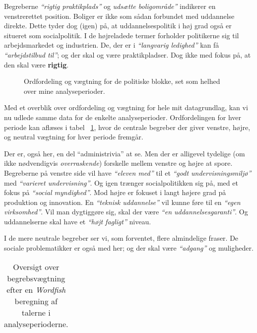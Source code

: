 Begreberne \textit{“rigtig praktikplads”} og \textit{udsætte boligområde”} indikerer en venstrerettet position.
Boliger er ikke som sådan forbundet med uddannelse direkte.
Dette tyder dog (igen) på, at uddannelsespolitik i høj grad også er situeret som socialpolitik.
I de højreladede termer forholder politikerne sig til arbejdsmarkedet og industrien.
De, der er i \textit{“langvarig ledighed”} kan få \textit{“arbejdstilbud til”}; og der skal og være praktikpladser. Dog ikke med fokus på, at den skal være \textbf{rigtig}.

\begin{figure}
\begin{adjustwidth}{-8em}{-8em}
 
\end{adjustwidth}
\caption{Ordfordeling og vægtning for de politiske blokke, set som helhed over mine analyseperioder.}
\label{fig:coef_blocXperiod}
\end{figure}

Med et overblik over ordfordeling og vægtning for hele mit datagrundlag, kan vi nu udlede samme data for de enkelte analyseperioder.
Ordfordelingen for hver periode kan aflæses i tabel ~\ref{tab:lrterms}, hvor de centrale begreber der giver venstre, højre, og neutral vægtning for hver periode fremgår.

Der er, også her, en del “administrivia” at se.
Men der er alligevel tydelige (om ikke nødvendigvis \textit{overraskende}) forskelle mellem venstre og højre at spore.
Begreberne på venstre side vil have \textit{“eleven med”} til et \textit{“godt undervisningsmiljø”} med \textit{“varieret undervisning”}.
Og igen trænger socialpolitikken sig på, med et fokus på \textit{“social myndighed”}.
Mod højre er fokuset i langt højere grad på produktion og innovation.
En \textit{“teknisk uddannelse”} vil kunne føre til en \textit{“egen virksomhed”}.
Vil man dygtiggøre sig, skal der være \textit{“en uddannelsesgaranti”}.
Og uddannelserne skal have et \textit{“højt fagligt”} niveau.

I de mere neutrale begreber ser vi, som forventet, flere almindelige fraser.
De sociale problematikker er også med her; og der skal være \textit{“adgang”} og muligheder.

\begin{table}
\caption{Oversigt over begrebsvægtning efter en \textit{Wordfish} beregning af talerne i analyseperioderne.}
\label{tab:lrterms}
\begin{adjustwidth}{-9em}{-9em}
\begin{tabular}{lp{2in}p{2in}p{2in}}

\end{tabular}
\end{adjustwidth}
\end{table}

